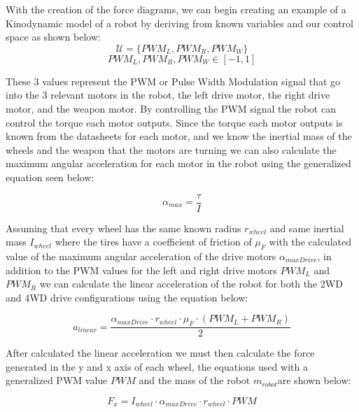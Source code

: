 \documentclass[conference]{IEEEtran}
\begin{document}
With the creation of the force diagrams, we can begin creating an example of a Kinodynamic model of a robot by deriving from known variables and our control space as shown below:
\begin{equation}
\mathcal{U} = \{PWM_L, PWM_R, PWM_W\}
\label{eq:control_space}
\end{equation}
\begin{equation}
PWM_L, PWM_R, PWM_W \in [-1,1]
\label{eq:control_space_dimensions}
\end{equation}

These 3 values represent the PWM or Pulse Width Modulation signal that go into the 3 relevant motors in the robot, the left drive motor, the right drive motor, and the weapon motor. By controlling the PWM signal the robot can control the torque each motor outputs.  Since the torque each motor outputs is known from the datasheets for each motor, and we know the inertial mass of the wheels and the weapon that the motors are turning we can also calculate the maximum angular acceleration for each motor in the robot using the generalized equation seen below:

\begin{equation}
\alpha_{max} = \frac{\tau}{I}
\label{eq:maximimum_angular_acceleration}
\end{equation}

Assuming that every wheel has the same known radius $r_{wheel}$ and same inertial mass $I_{wheel}$ where the tires have a coefficient of friction of $\mu_F$ with the calculated value of the maximum angular acceleration of the drive motors $\alpha_{maxDrive}$, in addition to the PWM values for the left and right drive motors $PWM_L$ and $PWM_R$  we can calculate the linear acceleration of the robot for both the 2WD and 4WD drive configurations using the equation below:


\begin{equation}
a_{linear}= \frac{\alpha_{maxDrive}\cdot r_{wheel} \cdot \mu_F \cdot (PWM_L + PWM_R)}{2}
\label{eq:linear_acceleration_calculation}
\end{equation}

After calculated the linear acceleration we must then calculate the force generated in the y and x axis of each wheel, the equations used with a generalized PWM value $PWM$ and the mass of the robot $m_{robot}$are shown below:

\begin{equation}
F_x = I_{wheel} \cdot  \alpha_{maxDrive} \cdot r_{wheel} \cdot PWM
\label{eq:X_direction_Wheel_Force}
\end{equation}
\end{document}
